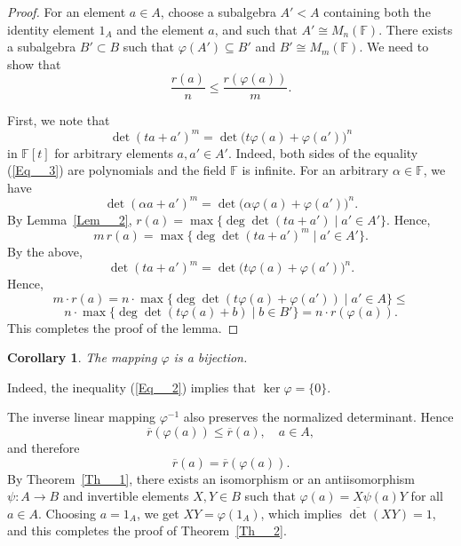 \documentclass[12pt]{amsart}
\newtheorem{corollary}{Corollary}
\begin{document}
{		
		\begin{proof} 		For an element $a \in A$, choose a subalgebra $A' < A$ containing  both the identity element $1_A$ and the element $ a$, and such that  $A' \cong M_n(\mathbb{F})$.	There exists a subalgebra $B' \subset B$ such that $\varphi(A') \subseteq B'$ and $B' \cong M_m(\mathbb{F})$.
		We need to show that
		\[
		\frac{r(a)}{n} \le \frac{r(\varphi(a))}{m}.
		\]
		
		First, we note that
		\begin{equation}\label{Eq__3}
		\det(t a + a')^m = \det \bigl( t \varphi(a) + \varphi(a') \bigr)^n
			\end{equation}
		in $\mathbb{F}[t]$ for arbitrary elements $a, a' \in A'$.
		Indeed, both sides of the equality (\ref{Eq__3}) are polynomials and the field $\mathbb{F}$ is infinite. For an arbitrary $\alpha \in \mathbb{F}$, we have
		\[
		\det(\alpha a + a')^m = \det \bigl( \alpha \varphi(a) + \varphi(a') \bigr)^n.
		\]
		By Lemma~\ref{Lem__2}, 	$r(a) = \max \{ \deg \det (t a + a') \mid a' \in A' \}.$	Hence,
		\[
		m \, r(a) = \max \{ \deg \det (t a + a')^m \mid a' \in A' \}.
		\]
		By the above,
		\[
		\det (t a + a')^m = \det \bigl( t \varphi(a) + \varphi(a') \bigr)^n.
		\] 		Hence,
		\[
		m\cdot r(a) 
		= n \cdot \max \{ \deg \det (t \varphi(a) + \varphi(a')) 
		\mid a' \in A \}
		\le \] \[  n \cdot \max \{ \deg \det (t \varphi(a) + b) 
		\mid b \in B' \} 
		= n \cdot  r(\varphi(a)).
		\]
		This completes the proof of the lemma. \end{proof}
		

		\begin{corollary}\label{Cor__3} 	The mapping $\varphi$ is a bijection. 	\end{corollary} 
		
		Indeed, the inequality (\ref{Eq__2})	implies that $\ker \varphi = \{0\}$.	
		
		

		
		The inverse linear mapping $\varphi^{-1}$ also preserves the normalized determinant. Hence
		\[
		\overline{r}(\varphi(a)) \le \overline{r}(a), \quad a \in A,
		\]
		and therefore
		\[
		\overline{r}(a) = \overline{r}(\varphi(a)).
		\]	By Theorem~\ref{Th__1}, there exists an isomorphism or an antiisomorphism
		$\psi \colon A \to B$ and invertible elements $X, Y \in B$
		such that $\varphi(a) = X \psi(a) Y$ for all $a \in A$.
		Choosing $a = 1_A$, we get $X Y  = \varphi(1_A)$,
		which implies $\overline{\det}(X Y) = 1$, 
		and this completes the proof of Theorem~\ref{Th__2}.
		
}
\end{document}
